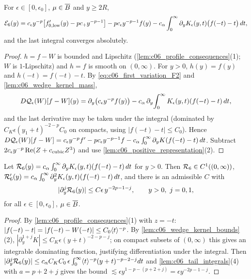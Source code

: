 \begin{lemma}
  \label{lem:c06_E6_exact_decomposition}
  For $\epsilon\in[0,\epsilon_0]$, $\mu\in\overline{B}$ and $y\ge2R$,
  \[\mathcal{E}_6(y)=c_\epsilon y^{-p}\bigl[f_{0,\textup{low}}'(y)-pc_+y^{-p-1}\bigr]-pc_\epsilon y^{-p-1}f(y)
     -c_\alpha\int_0^\infty\partial_yK_\epsilon(y,t)\bigl(f(-t)-t\bigr)\,dt,\]
  and the last integral converges absolutely.
\end{lemma}
\begin{proof}
  $h=f-W$ is bounded and Lipschitz (\cref{lem:c06_profile_consequences}(1); $W$ is $1$-Lipschitz) and
  $h=f$ is smooth on $(0,\infty)$. For $y>0$, $h(y)=f(y)$ and $h(-t)=f(-t)-t$. By
  \eqref{eq:c06_first_variation_F2} and \cref{lem:c06_wedge_kernel_mass},
  \[D\mathcal{Q}_\epsilon(W)[f-W](y)=\partial_y\bigl(c_\epsilon y^{-p}f(y)\bigr)-c_\alpha\,\partial_y\!\int_0^\infty K_\epsilon(y,t)(f(-t)-t)\,dt,\]
  and the last derivative may be taken under the integral (dominated by $C_K\epsilon(y_1+t)^{-2-p}C_0$ on compacts, using $|f(-t)-t|\le C_0$).
  Hence $D\mathcal{Q}_\epsilon(W)[f-W]=c_\epsilon y^{-p}f'-pc_\epsilon y^{-p-1}f-c_\alpha\int_0^\infty\partial_yK(f(-t)-t)\,dt$.
  Subtract $2c_\epsilon y^{-p}\operatorname{Re}(Z+c_{\textup{cubic}}Z^3)$ and use
  \cref{lem:c06_positive_representation}(2).
\end{proof}

\begin{lemma}
  \label{lem:c06_E6_remote_term}
  Let $\mathcal{R}_6(y)=c_\alpha\int_0^\infty\partial_yK_\epsilon(y,t)(f(-t)-t)\,dt$ for $y>0$. Then $\mathcal{R}_6\in C^1((0,\infty))$,
  $\mathcal{R}_6'(y)=c_\alpha\int_0^\infty\partial_y^2K_\epsilon(y,t)(f(-t)-t)\,dt$, and there is an admissible $C$ with
  \[|\partial_y^j\mathcal{R}_6(y)|\le C\epsilon\,y^{-2p-1-j},\qquad y>0,\ j=0,1,\]
  for all $\epsilon\in[0,\epsilon_0]$, $\mu\in\overline{B}$.
\end{lemma}
\begin{proof}
  By \cref{lem:c06_profile_consequences}(1) with $z=-t$: $|f(-t)-t|=|f(-t)-W(-t)|\le C_0\langle t \rangle^{-p}$.
  By \cref{lem:c06_wedge_kernel_bounds}(2), $|\partial_y^{1+j}K|\le C_K\epsilon(y+t)^{-2-p-j}$; on compact subsets of
  $(0,\infty)$ this gives an integrable dominating function, justifying differentiation under the integral.
  Then $|\partial^j_y\mathcal{R}_6(y)|\le c_\alpha C_KC_0\,\epsilon\int_0^\infty\langle t \rangle^{-p}(y+t)^{-p-2-j}dt$ and
  \cref{lem:c06_tail_integrals}(4) with $a=p+2+j$ gives the bound $\lesssim\epsilon y^{1-p-(p+2+j)}=\epsilon y^{-2p-1-j}$.
\end{proof}

